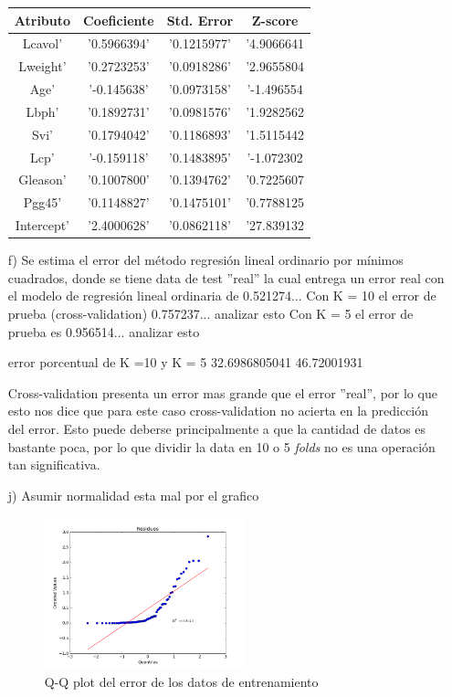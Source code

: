 \documentclass[10pt]{article}
\begin{document}
\begin{itemize}
\begin{table}
  \begin{center}
    \begin{tabular}{|c|c|c|c|} \hline
    Atributo & Coeficiente & Std. Error & Z-score \\ \hline
    Lcavol' &'0.5966394' &'0.1215977' &'4.9066641 \\
 	Lweight' & '0.2723253' &'0.0918286'& '2.9655804 \\
 	Age' & '-0.145638' &'0.0973158' &'-1.496554 \\
 	Lbph' & '0.1892731' & '0.0981576'& '1.9282562 \\
 	Svi' & '0.1794042' & '0.1186893' &'1.5115442 \\
 	Lcp' & '-0.159118' & '0.1483895' &'-1.072302 \\
 	Gleason' & '0.1007800' &'0.1394762'& '0.7225607 \\
 	Pgg45' & '0.1148827'& '0.1475101' &'0.7788125 \\
 	Intercept' & '2.4000628'& '0.0862118'& '27.839132 \\ \hline
    \end{tabular}
  \end{center}
\end{table}


\item[f)] Se estima el error del método regresión lineal ordinario por mínimos cuadrados, donde se tiene data de test ''real'' la cual entrega un error real con el modelo de regresión lineal ordinaria de 0.521274...
Con K = 10 el error de prueba (cross-validation) 0.757237... analizar esto
Con K = 5 el error de prueba es 0.956514... analizar esto

error porcentual de K =10 y K = 5
32.6986805041
46.72001931

Cross-validation presenta un error mas grande que el error ''real'', por lo que esto nos dice que para este caso cross-validation no acierta en la predicción del error. Esto puede deberse principalmente a que la cantidad de datos es bastante poca, por lo que dividir la data en 10 o 5 \textit{folds} no es una operación tan significativa.

\item[j)] Asumir normalidad esta mal por el grafico

\begin{figure}[h]
    \centering
    \includegraphics[width=0.55\textwidth]{images/qqplot}
    \caption{Q-Q plot del error de los datos de entrenamiento}
    \label{fig:mesh1}
\end{figure}


\end{itemize}
\end{document}
